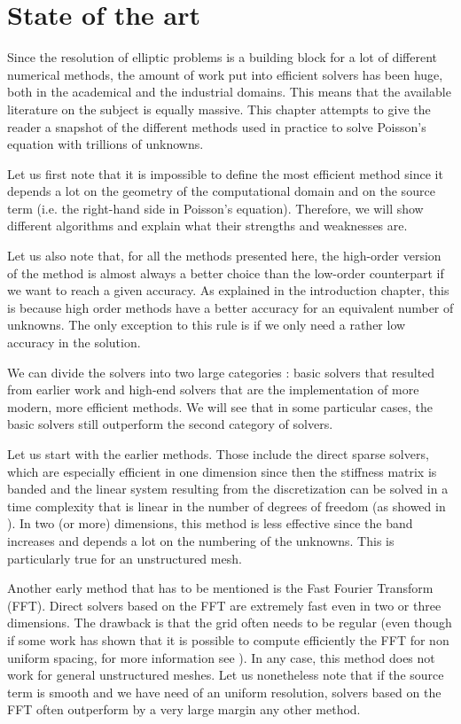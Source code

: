 \chapter{State of the art}

Since the resolution of elliptic problems is a building block for a lot of different numerical methods, the amount of work put into efficient solvers has been huge, both in the academical and the industrial domains. This means that the available literature on the subject is equally massive. This chapter attempts to give the reader a snapshot of the different methods used in practice to solve Poisson's equation with trillions of unknowns.

Let us first note that it is impossible to define the most efficient method since it depends a lot on the geometry of the computational domain and on the source term (i.e. the right-hand side in Poisson's equation). Therefore, we will show different algorithms and explain what their strengths and weaknesses are. 

Let us also note that, for all the methods presented here, the high-order version of the method is almost always a better choice than the low-order counterpart if we want to reach a given accuracy. As explained in the introduction chapter, this is because high order methods have a better accuracy for an equivalent number of unknowns. The only exception to this rule is if we only need a rather low accuracy in the solution.  

We can divide the solvers into two large categories : basic solvers that resulted from earlier work and high-end solvers that are the implementation of more modern, more efficient methods. We will see that in some particular cases, the basic solvers still outperform the second category of solvers. 

Let us start with the earlier methods. Those include the direct sparse solvers, which are especially efficient in one dimension since then the stiffness matrix is banded and the linear system resulting from the discretization can be solved in a time complexity that is linear in the number of degrees of freedom (as showed in \cite{banded}). In two (or more) dimensions, this method is less effective since the band increases and depends a lot on the numbering of the unknowns. This is particularly true for an unstructured mesh. 

Another early method that has to be mentioned is the Fast Fourier Transform (FFT). Direct solvers based on the FFT are extremely fast even in two or three dimensions. The drawback is that the grid often needs to be regular (even though if some work has shown that it is possible to compute efficiently the FFT for non uniform spacing, for more information see \cite{fft}). In any case, this method does not work for general unstructured meshes. Let us nonetheless note that if the source term is smooth and we have need of an uniform resolution, solvers based on the FFT often outperform by a very large margin any other method. 

